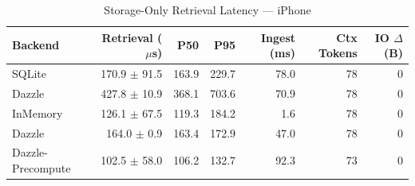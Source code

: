 \begin{table}[ht]
\centering
\caption{Storage-Only Retrieval Latency — iPhone}
\label{tab:storage-only}
\begin{tabular}{lrrrrrr}
\toprule
Backend & Retrieval ($\mu$s) & P50 & P95 & Ingest (ms) & Ctx Tokens & IO $\Delta$ (B) \\
\midrule
  SQLite & 170.9 $\pm$ 91.5 & 163.9 & 229.7 & 78.0 & 78 & 0 \\
  Dazzle & 427.8 $\pm$ 10.9 & 368.1 & 703.6 & 70.9 & 78 & 0 \\
  InMemory & 126.1 $\pm$ 67.5 & 119.3 & 184.2 & 1.6 & 78 & 0 \\
  Dazzle & 164.0 $\pm$ 0.9 & 163.4 & 172.9 & 47.0 & 78 & 0 \\
  Dazzle-Precompute & 102.5 $\pm$ 58.0 & 106.2 & 132.7 & 92.3 & 73 & 0 \\
\bottomrule
\end{tabular}
\end{table}
